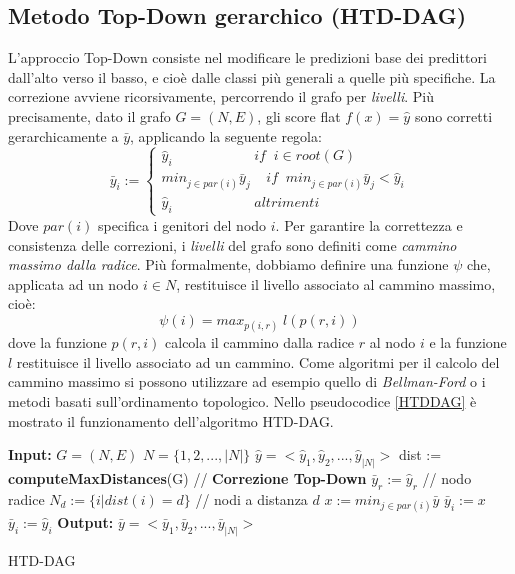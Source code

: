 \documentclass[12pt]{report}
\begin{document}
\subsection{Metodo Top-Down gerarchico (HTD-DAG)}
L'approccio Top-Down\cite{notaro1} consiste nel modificare le predizioni base dei predittori dall'alto verso il basso, e cioè dalle classi più generali a quelle più specifiche.
\newline
\newline
La correzione avviene ricorsivamente, percorrendo il grafo per \emph{livelli}. Più precisamente, dato il grafo $G = (N, E)$, gli score flat $f(x) = \hat{y}$ sono corretti gerarchicamente a $\bar{y}$, applicando la seguente regola:
\[
\bar{y}_i := 
\begin{cases}
\hat{y}_i \;\;\;\;\;\;\;\;\;\;\;\;\;\;\;\;\;\;\;\;\; if\;\; i \in root(G)\\
min_{j \in par(i)} \bar{y}_j \;\;\;\; if \;\; min_{j \in par(i)}\bar{y}_j < \hat{y}_i\\
\hat{y}_i \;\;\;\;\;\;\;\;\;\;\;\;\;\;\;\;\;\;\;\;\; altrimenti
\end{cases}
\]
Dove $par(i)$ specifica i genitori del nodo $i$.
\newline
\newline
Per garantire la correttezza e consistenza delle correzioni, i \emph{livelli} del grafo sono definiti come \emph{cammino massimo dalla radice}. Più formalmente, dobbiamo definire una funzione $\psi$ che, applicata ad un nodo $i \in N$, restituisce il livello associato al cammino massimo, cioè:
\[
\psi(i) = max_{p(i, r)}\; l(p(r, i))
\]
dove la funzione $p(r, i)$ calcola il cammino dalla radice $r$ al nodo $i$ e la funzione $l$ restituisce il livello associato ad un cammino.
\newline
Come algoritmi per il calcolo del cammino massimo si possono utilizzare ad esempio quello di \emph{Bellman-Ford} o i metodi basati sull'ordinamento topologico\cite{BELLMAN}.
\newline
\newline
Nello pseudocodice \ref{HTDDAG} è mostrato il funzionamento dell'algoritmo HTD-DAG.
\begin{algorithm}[!htp]
\begin{algorithmic}[1]
\State \textbf{Input: }
\State $G = (N, E)$
\State $N = \{1, 2, ..., |N|\} $ 
\State $\hat{y} = <\hat{y}_1, \hat{y}_2, ...,\hat{y}_{|N|}>$
\State dist := \textbf{computeMaxDistances}(G)
\State // \textbf{Correzione Top-Down}
\State $\bar{y}_r := \hat{y}_r$  // nodo radice 
\State $N_d := \{i|dist(i) = d\}$ // nodi a distanza $d$ 
\State $x:= min_{j \in par(i)} \bar{y}$
\State $\bar{y}_i := x $
\Else
\State $\bar{y}_i := \hat{y}_i $
\EndIf
\EndFor
\EndFor
\EndProcedure
\State \textbf{Output: }
\State $\bar{y} = <\bar{y}_1, \bar{y}_2, ...,\bar{y}_{|N|}>$
\end{algorithmic}
\caption{HTD-DAG}
\label{HTDDAG}
\end{algorithm}
\end{document}
